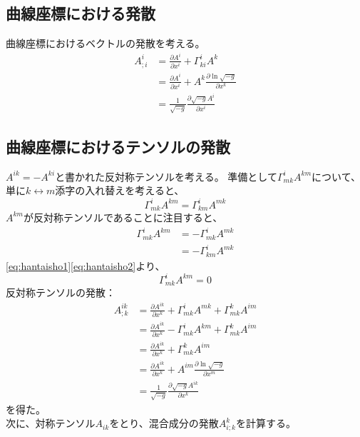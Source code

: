 \documentclass{jsarticle}
\newcommand{\pder}[2][]{\frac{\partial#1}{\partial#2}}
\begin{document}
\subsection{曲線座標における発散}
曲線座標におけるベクトルの発散を考える。
\begin{align}
    A^{i}_{;i} 
    &= 
    \pder[A^{i}]{x^i} + \Gamma^i_{ki}A^k\\
    &=
    \pder[A^{i}]{x^i} + A^k\pder[\ln{\sqrt{-g}}]{x^k}\\
    &=
    \frac{1}{\sqrt{-g}}\frac{\partial \sqrt{-g}A^{i}}{\partial{x^{i}}}
    \label{eq:aidiv}
\end{align}
\subsection{曲線座標におけるテンソルの発散}
$A^{ik} = - A^{ki}$と書かれた反対称テンソルを考える。
準備として$\Gamma^i_{mk}A^{km}$について、単に$k \leftrightarrow m$添字の入れ替えを考えると、
\begin{equation}
    \Gamma^i_{mk}A^{km} = \Gamma^i_{km}A^{mk}\label{eq:hantaisho1}
\end{equation}
$A^{km}$が反対称テンソルであることに注目すると、
\begin{align}
    \Gamma^i_{mk}A^{km} &= -\Gamma^i_{mk}A^{mk}\\
                        &= -\Gamma^i_{km}A^{mk}\label{eq:hantaisho2}
\end{align}
\eqref{eq:hantaisho1}\eqref{eq:hantaisho2}より、
\begin{equation}
    \Gamma^i_{mk}A^{km} = 0\label{eq:hantaisho3}
\end{equation}
反対称テンソルの発散：
\begin{align}
    A^{ik}_{;k} 
    &= 
    \pder[A^{ik}]{x^k} + \Gamma^i_{mk}A^{mk} + \Gamma^k_{mk}A^{im}\\
    &=
    \pder[A^{ik}]{x^k} - \Gamma^i_{mk}A^{km} + \Gamma^k_{mk}A^{im}\\
    &=
    \pder[A^{ik}]{x^k} + \Gamma^k_{mk}A^{im}\\
    &=
    \pder[A^{ik}]{x^k} + A^{im}\pder[\ln{\sqrt{-g}}]{x^m}\\
    &=
    \frac{1}{\sqrt{-g}}\frac{\partial \sqrt{-g}A^{ik}}{\partial{x^{k}}}
\end{align}
を得た。\\
次に、対称テンソル$A_{ik}$をとり、混合成分の発散$A^k_{i;k}$を計算する。
\end{document}
